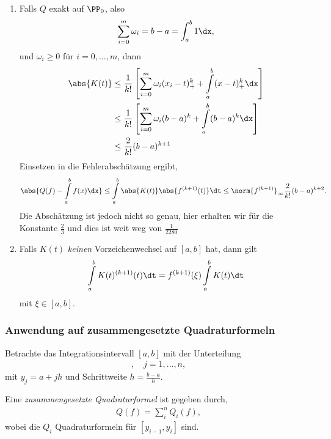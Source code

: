 \begin{bemn}[Bemerkungen.]
\begin{enumerate}[label=\arabic{*}.)]
\item Falls $Q$ exakt auf $\PP_0$, also
\begin{align*}
\sum\limits_{i=0}^m \omega_i = b-a = \int_a^b 1\dx,
\end{align*}
und $\omega_i \ge 0$ für $i=0,\ldots,m$, dann
\begin{align*}
\abs{K(t)} &\le \frac{1}{k!}\left[ \sum\limits_{i=0}^m \omega_i (x_i-t)_+^k +
\int\limits_a^b (x-t)_+^k \dx \right]\\
&\le  \frac{1}{k!}\left[ \sum\limits_{i=0}^m \omega_i (b-a)^k +
\int\limits_a^b (b-a)^k \dx \right] \\ &\le
\frac{2}{k!}(b-a)^{k+1}
\end{align*}
Einsetzen in die Fehlerabschätzung ergibt,
\begin{align*}
\abs{Q(f)-\int\limits_a^b f(x)\dx} \le
\int\limits_a^b \abs{K(t)}\abs{f^{(k+1)}(t)}\dt
\le \norm{f^{(k+1)}}_\infty \frac{2}{k!}(b-a)^{k+2}.
\end{align*}
Die Abschätzung ist jedoch nicht so genau, hier erhalten wir für die Konstante
$\frac{2}{3}$ und dies ist weit weg von $\frac{1}{2280}$
\item
Falls $K(t)$ \textit{keinen} Vorzeichenwechsel auf $[a,b]$ hat, dann gilt
\begin{align*}
\int\limits_a^b K(t)^{(k+1)}(t)\dt = f^{(k+1)}(\xi)\int\limits_a^b K(t)\dt
\end{align*}
mit $\xi\in[a,b]$.\maphere
\end{enumerate}
\end{bemn}

\subsubsection{Anwendung auf zusammengesetzte Quadraturformeln}

Betrachte das Integrationsintervall $[a,b]$ mit der Unterteilung
\begin{align*}
[y_{j-1},y_j],\quad j=1,\ldots,n,
\end{align*}
mit $y_j = a+jh$ und Schrittweite $h=\frac{b-a}{h}$.

\begin{defnn}
Eine \emph{zusammengesetzte Quadraturformel} ist gegeben durch,
\begin{align*}
Q(f) = \sum\limits_i^n Q_i(f),
\end{align*}
wobei die $Q_i$ Quadraturformeln für $[y_{i-1},y_i]$ sind.\fishhere
\end{defnn}

